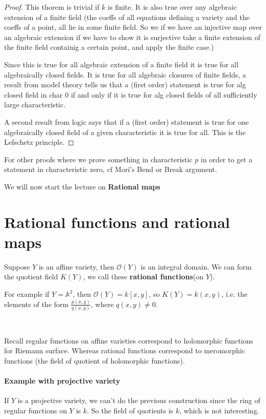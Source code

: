 \begin{proof}
    This thorem is trivial if $k$ is finite. It is also true over any algebraic extension of a finite field (the coeffs of all equations defining a variety and the coeffs of a point, all lie in some finite field. So we if we have an injective map over an algebraic extension if we have to show it is surjective take a finite extension of the finite field containig a certain point, and apply the finite case.)


    Since this is true for all algebraic extension of a finite field it is true for all algebraically closed fields. It is true for all algebraic closures of finite fields, a result from model theory tells us that a (first order) statement is true for alg closed field in char $0$ if and only if it is true for alg closed fields of all sufficiently large characteristic.
    
    A second result from logic says that if a (first order) statement is true for one algebraically closed field of a given characteristic it is true for all.  This is the Lefschetz principle.
\end{proof}
For other proofs where we prove something in characteristic $p$ in order to get a statement in characteristic zero, cf Mori's Bend or Break argument.


We will now start the lecture on \textbf{Rational maps}

\section{Rational functions and rational maps}
\begin{definition}
    Suppose $Y$ is an affine variety, then $\mathcal{O}(Y)$ is an integral domain. We can form the quotient field $K(Y)$, we call these \textbf{rational functions}(on $Y$).
\end{definition}

For example if $Y=\mathbb{A}^2$, then $\mathcal{O}(Y) = k[x,y]$, so $K(Y) = k(x,y)$, i.e. the elements of the form $\frac{p(x,y)}{q(x,y)}$, where $q(x,y)\neq 0$.

\

Recall regular functions on affine varieties correspond to holomorphic functions for Riemann surface. Whereas rational functions correspond to meromorphic functions (the field of quotient of holomorphic functions).

\paragraph*{Example with projective variety}
If $Y$ is a projective variety, we can't do the previous construction since the ring of regular functions on $Y$ is $k$. So the field of quotients is $k$, which is not interesting.

